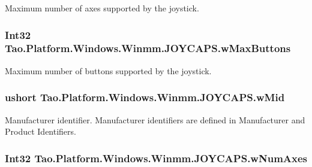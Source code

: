 Maximum number of axes supported by the joystick. 

\hypertarget{struct_tao_1_1_platform_1_1_windows_1_1_winmm_1_1_j_o_y_c_a_p_s_a012f8f0a0a5538d82b71a53f158f0f47}{
\subsubsection[{wMaxButtons}]{\setlength{\rightskip}{0pt plus 5cm}Int32 {\bf Tao.Platform.Windows.Winmm.JOYCAPS.wMaxButtons}}}
\label{struct_tao_1_1_platform_1_1_windows_1_1_winmm_1_1_j_o_y_c_a_p_s_a012f8f0a0a5538d82b71a53f158f0f47}


Maximum number of buttons supported by the joystick. 

\hypertarget{struct_tao_1_1_platform_1_1_windows_1_1_winmm_1_1_j_o_y_c_a_p_s_a13f17a3bcf6af2493d34aa0b9b469dd0}{
\subsubsection[{wMid}]{\setlength{\rightskip}{0pt plus 5cm}ushort {\bf Tao.Platform.Windows.Winmm.JOYCAPS.wMid}}}
\label{struct_tao_1_1_platform_1_1_windows_1_1_winmm_1_1_j_o_y_c_a_p_s_a13f17a3bcf6af2493d34aa0b9b469dd0}


Manufacturer identifier. Manufacturer identifiers are defined in Manufacturer and Product Identifiers. 

\hypertarget{struct_tao_1_1_platform_1_1_windows_1_1_winmm_1_1_j_o_y_c_a_p_s_a8fe9520e766214bebfc4874805620afc}{
\subsubsection[{wNumAxes}]{\setlength{\rightskip}{0pt plus 5cm}Int32 {\bf Tao.Platform.Windows.Winmm.JOYCAPS.wNumAxes}}}
\label{struct_tao_1_1_platform_1_1_windows_1_1_winmm_1_1_j_o_y_c_a_p_s_a8fe9520e766214bebfc4874805620afc}


